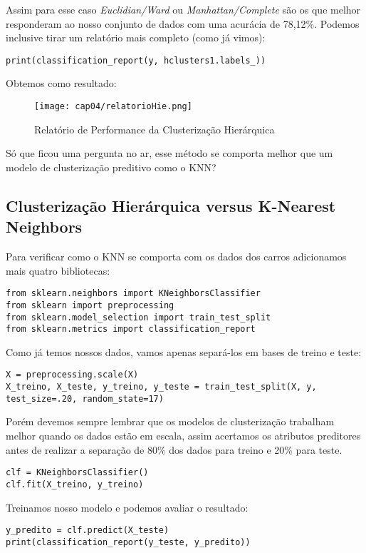 Assim para esse caso \textit{Euclidian/Ward} ou \textit{Manhattan/Complete} são os que melhor responderam ao nosso conjunto de dados com uma acurácia de 78,12\%. Podemos inclusive tirar um relatório mais completo (como já vimos):
\begin{lstlisting}[]
print(classification_report(y, hclusters1.labels_))
\end{lstlisting}

Obtemos como resultado:
\begin{figure}[H]
	\centering
	\texttt{[image: cap04/relatorioHie.png]}
	\caption{Relatório de Performance da Clusterização Hierárquica}
\end{figure}


Só que ficou uma pergunta no ar, esse método se comporta melhor que um modelo de clusterização preditivo como o KNN?

\subsection{Clusterização Hierárquica versus K-Nearest Neighbors}
Para verificar como o KNN se comporta com os dados dos carros adicionamos mais quatro bibliotecas:
\begin{lstlisting}[]
from sklearn.neighbors import KNeighborsClassifier
from sklearn import preprocessing
from sklearn.model_selection import train_test_split
from sklearn.metrics import classification_report
\end{lstlisting}

Como já temos nossos dados, vamos apenas separá-los em bases de treino e teste:
\begin{lstlisting}[]
X = preprocessing.scale(X)
X_treino, X_teste, y_treino, y_teste = train_test_split(X, y, test_size=.20, random_state=17)
\end{lstlisting}

Porém devemos sempre lembrar que os modelos de clusterização trabalham melhor quando os dados estão em escala, assim acertamos os atributos preditores antes de realizar a separação de 80\% dos dados para treino e 20\% para teste.
\begin{lstlisting}[]
clf = KNeighborsClassifier()
clf.fit(X_treino, y_treino)
\end{lstlisting}

Treinamos nosso modelo e podemos avaliar o resultado:
\begin{lstlisting}[]
y_predito = clf.predict(X_teste)
print(classification_report(y_teste, y_predito))
\end{lstlisting}
	
